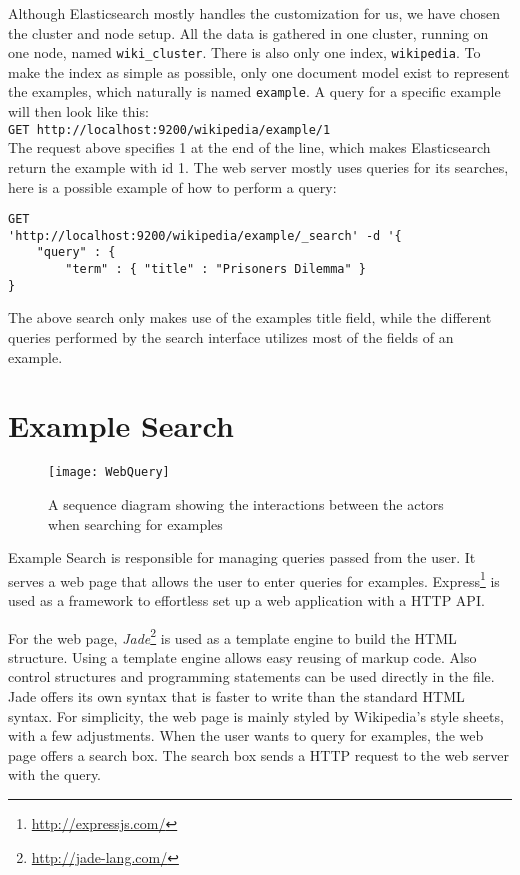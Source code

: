 Although Elasticsearch mostly handles the customization for us, we have chosen the cluster and node setup. All the data is gathered in one cluster, running on one node, named \texttt{wiki\_cluster}. There is also only one index, \texttt{wikipedia}. To make the index as simple as possible, only one document model exist to represent the examples, which naturally is named \texttt{example}. A query for a specific example will then look like this:\\
\texttt{GET http://localhost:9200/wikipedia/example/1}\\
The request above specifies 1 at the end of the line, which makes Elasticsearch return the example with id 1.
The web server mostly uses queries for its searches, here is a possible example of how to perform a query:
\begin{Verbatim}[fontsize=\small]
GET 
'http://localhost:9200/wikipedia/example/_search' -d '{
    "query" : {
        "term" : { "title" : "Prisoners Dilemma" }
}
\end{Verbatim}
The above search only makes use of the examples title field, while the different queries performed by the search interface utilizes most of the fields of an example.


\section{Example Search}

\begin{figure}[H] 
\caption{A sequence diagram showing the interactions between the actors when searching for examples}
\texttt{[image: WebQuery]}
\label{fig:web_query}
\end{figure}

Example Search is responsible for managing queries passed from the user. It serves a web page that allows the user to enter queries for examples. Express\footnote{\url{http://expressjs.com/}} is used as a framework to effortless set up a web application with a HTTP API.

For the web page, \textit{Jade}\footnote{\url{http://jade-lang.com/}} is used as a template engine to build the HTML structure. Using a template engine allows easy reusing of markup code. Also control structures and programming statements can be used directly in the file. Jade offers its own syntax that is faster to write than the standard HTML syntax. For simplicity, the web page is mainly styled by Wikipedia's style sheets, with a few adjustments. When the user wants to query for examples, the web page offers a search box. The search box sends a HTTP request to the web server with the query.

